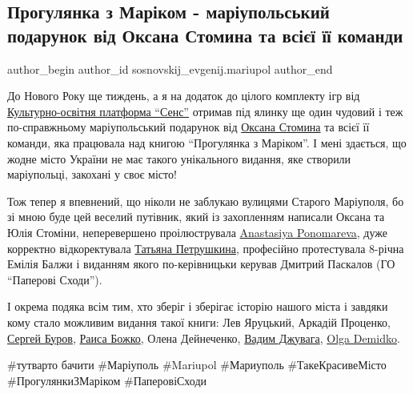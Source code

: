  
 
 
 
 

\subsection{Прогулянка з Маріком - маріупольський подарунок від Оксана Стомина та всієї її команди}
\label{sec:23_12_2020.fb.sosnovskij_evgenij.mariupol.1.progulyanka_z_mar_ko}

\ifcmt
 author_begin
   author_id sosnovskij_evgenij.mariupol
 author_end
\fi

До Нового Року ще тиждень, а я на додаток до цілого комплекту ігр від
\href{https://www.facebook.com/Cultural.and.educational.platform.sense}{Культурно-освітня
платформа \enquote{Сенс}}  отримав під ялинку ще один чудовий і теж
по-справжньому маріупольський подарунок від
\href{https://www.facebook.com/oksana.stomina}{Оксана Стомина} та всієї її
команди, яка працювала над книгою \enquote{Прогулянка з Маріком}. І мені
здається, що жодне місто України не має такого унікального видання, яке
створили маріупольці, закохані у своє місто!

Тож тепер я впевнений, що ніколи не заблукаю вулицями Старого Маріуполя, бо зі
мною буде цей веселий путівник, який із захопленням написали Оксана та Юлія
Стоміни, неперевершено проілюструвала
\href{https://www.facebook.com/profile.php?id=100000576599040}{Anastasiya
Ponomareva}, дуже корректно відкоректувала
\href{https://www.facebook.com/tetiana.petrushkina}{Татьяна Петрушкина},
професійно протестувала 8-річна Емілія Балжи і виданням якого по-керівницьки
керував Дмитрий Паскалов (ГО \enquote{Паперові Сходи}).

І окрема подяка всім тим, хто зберіг і зберігає історію нашого міста і завдяки
кому стало можливим видання такої книги: Лев Яруцький, Аркадій Проценко,
\href{https://www.facebook.com/profile.php?id=100005851476252}{Сергей Буров},
\href{https://www.facebook.com/bogko.raisa}{Раиса Божко}, Олена Дейнеченко,
\href{https://www.facebook.com/vadim.dzuvaga}{Вадим Джувага},
\href{https://www.facebook.com/profile.php?id=100009080371413}{Olga Demidko}.

\#тутварто бачити \#Маріуполь \#Mariupol \#Мариуполь \#ТакеКрасивеМісто \#ПрогулянкиЗМаріком \#ПаперовіСходи
